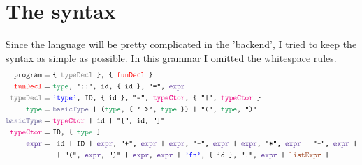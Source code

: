 \documentclass{article}
\begin{document}
\section{The syntax}
Since the language will be pretty complicated in the 'backend', I tried to keep the syntax as simple as possible. In this grammar I omitted the whitespace rules.
\begin{align*}
\texttt{program}  =\ & \texttt{\{ \color{gray}typeDecl \color{black} \}, \{ \color{red}funDecl \color{black} \}}\\
\texttt{\color{red}funDecl\color{black}} =\ & \texttt{\color{ForestGreen}type\color{black}, '::', id, \{ id \}, "=", \color{RoyalPurple}expr\color{black}}\\
\texttt{\color{gray}typeDecl\color{black}} =\ &\texttt{\color{blue}'type'\color{black}, ID, \{ id \}, "=", \color{RubineRed}typeCtor\color{black}, \{ "|", \color{RubineRed}typeCtor \color{black} \}}\\
\texttt{\color{ForestGreen}type\color{black}} =\ &\texttt{\color{CadetBlue}basicType \color{black} | (\color{ForestGreen}type\color{black}, \{ '->', \color{ForestGreen}type \color{black} \}) | "(", \color{ForestGreen}type\color{black}, ")"}\\
\texttt{\color{CadetBlue}basicType} =\ &	\texttt{\color{RubineRed}typeCtor \color{black}| id | "[", id, "]"}\\
\texttt{\color{RubineRed}typeCtor\color{black}} =\ & \texttt{ID, \{ \color{ForestGreen}type \color{black} \}}\\
\texttt{\color{RoyalPurple}expr\color{black}} =\ &  \texttt{
	id
	| ID
	| \color{RoyalPurple}expr\color{black}, "+", \color{RoyalPurple}expr \color{black} 
	| \color{RoyalPurple}expr\color{black}, "-", \color{RoyalPurple}expr \color{black} 
	| \color{RoyalPurple}expr\color{black}, "*", \color{RoyalPurple}expr \color{black}
	| "-", \color{RoyalPurple}expr \color{black}
|}\\
&\texttt{
	| "(", \color{RoyalPurple}expr\color{black}, ")" 
	| \color{RoyalPurple}expr\color{black}, \color{RoyalPurple}expr \color{black} 
	| \color{blue}'fn'\color{black}, \{ id \}, ".", \color{RoyalPurple}expr \color{black} 
	| \color{RawSienna}listExpr \color{black} 
|}\\
&\texttt{
}
\end{align*}
\end{document}

